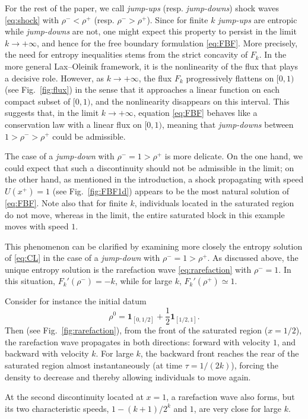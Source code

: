 \documentclass[11pt,twoside]{article}
\numberwithin{equation}{section}
\newcommand {\f}   {\frac}
\begin{document}
For the rest of the paper, we call  \textit{jump-ups} (resp. \textit{jump-downs}) shock waves \eqref{eq:shock} with $\rho^-<\rho^+$ (resp. $\rho^->\rho^+$). Since for finite $k$ \textit{jump-ups} are entropic while \textit{jump-downs} are not, one might expect this property to persist in the limit $k \to +\infty$, and hence for the free boundary formulation \eqref{eq:FBF}. More precisely, the need for entropy inequalities stems from the strict concavity of $F_k$. In the more general Lax–Oleinik framework, it is the nonlinearity of the flux that plays a decisive role. However, as $k\to+\infty$, the flux $F_k$ progressively flattens on $[0,1)$ (see Fig.~\ref{fig:flux}) in the sense that it approaches a linear function on each compact subset of $[0,1)$, and the nonlinearity disappears on this interval. This suggests that, in the limit $k\to+\infty$, equation \eqref{eq:FBF} behaves like a conservation law with a linear flux on $[0,1)$, meaning that \textit{jump-downs} between $1>\rho^->\rho^+$ could be admissible.

The case of a \textit{jump-down} with $\rho^-=1>\rho^+$ is more delicate. On the one hand, we could expect that such a discontinuity should not be admissible in the limit; on the other hand, as mentioned in the introduction, a shock propagating with speed $U(x^+)=1$ (see Fig.~\ref{fig:FBF1d}) appears to be the most natural solution of \eqref{eq:FBF}. Note also that for finite $k$, individuals located in the saturated region do not move, whereas in the limit, the entire saturated block in this example moves with speed $1$.

This phenomenon can be clarified by examining more closely the entropy solution of \eqref{eq:CL} in the case of a \textit{jump-down} with $\rho^-=1>\rho^+$. As discussed above, the unique entropy solution is the rarefaction wave \eqref{eq:rarefaction} with $\rho^-=1$. In this situation, $F_k'(\rho^-)= -k$, while for large $k$, $F_k'(\rho^+)\simeq 1$. 

Consider for instance the initial datum
\[
\rho^0 = \mathbf{1}_{[0, 1/2]} 
+ \f{1}{2}\mathbf{1}_{[1/2,1]}.
\]
Then (see Fig.~\ref{fig:rarefaction}), from the front of the saturated region ($x=1/2$), the rarefaction wave propagates in both directions: forward with velocity $1$, and backward with velocity $k$. For large $k$, the backward front reaches the rear of the saturated region almost instantaneously (at time $\tau=1/(2k)$), forcing the density to decrease and thereby allowing individuals to move again. 

At the second discontinuity located at $x=1$, a rarefaction wave also forms, but its two characteristic speeds, $1-(k+1)/2^k$ and $1$, are very close for large $k$.
\end{document}

